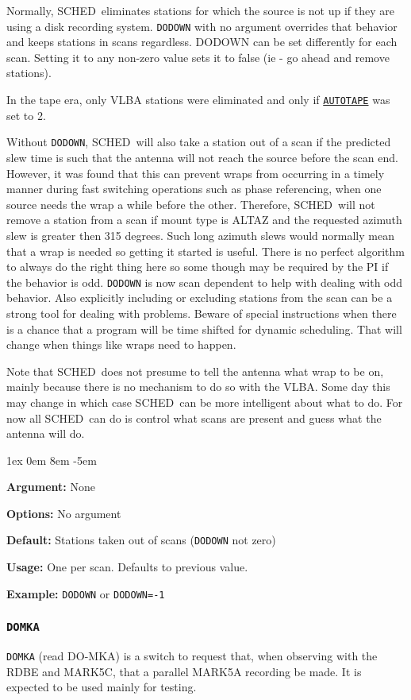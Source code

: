 \documentclass{report}
\newcommand{\schedb}{{\sc SCHED~}}
\newcommand{\rcwbox}[5]{
  \begin{list}{}{\parsep 1ex  \itemsep 0em
                 \leftmargin 8em  \itemindent -5em }
    \item {\bf Argument:} #1
    \item {\bf Options:}  #2
    \item {\bf Default:}  #3
    \item {\bf Usage:}    #4
    \item {\bf Example:}  #5
  \end{list}
}
\begin{document}
Normally, \schedb eliminates stations for which the source is not up
if they are using a disk recording system.  {\tt DODOWN} with no
argument overrides that behavior and keeps stations in scans
regardless.  DODOWN can be set differently for each scan.  Setting
it to any non-zero value sets it to false (ie - go ahead and remove
stations).

In the tape era, only VLBA stations were eliminated and only if
{\hyperref[MP:AUTOTAPE]{{\tt AUTOTAPE}}} was set to 2.

Without {\tt DODOWN}, \schedb will also take a station out of a scan
if the predicted slew time is such that the antenna will not reach the
source before the scan end.  However, it was found that this can
prevent wraps from occurring in a timely manner during fast switching
operations such as phase referencing, when one source needs the wrap a
while before the other.  Therefore, \schedb will not remove a station
from a scan if mount type is ALTAZ and the requested azimuth slew is
greater then 315 degrees.  Such long azimuth slews would normally mean
that a wrap is needed so getting it started is useful.  There is no
perfect algorithm to always do the right thing here so some though may
be required by the PI if the behavior is odd.  {\tt DODOWN} is now
scan dependent to help with dealing with odd behavior.  Also
explicitly including or excluding stations from the scan can be a
strong tool for dealing with problems.  Beware of special instructions
when there is a chance that a program will be time shifted for dynamic
scheduling.  That will change when things like wraps need to happen.

Note that \schedb does not presume to tell the antenna what wrap to be
on, mainly because there is no mechanism to do so with the VLBA.  Some
day this may change in which case \schedb can be more intelligent
about what to do.  For now all \schedb can do is control what scans
are present and guess what the antenna will do.

\rcwbox
{None}
{No argument}
{Stations taken out of scans ({\tt DODOWN} not zero)}
{One per scan.  Defaults to previous value.}
{{\tt DODOWN} or {\tt DODOWN=-1}}


\subsubsection{\label{MP:DOMKA}{\tt DOMKA}}

{\tt DOMKA} (read DO-MKA) is a switch to request that, when observing
with the RDBE and MARK5C, that a parallel MARK5A recording be made.
It is expected to be used mainly for testing.
\end{document}
